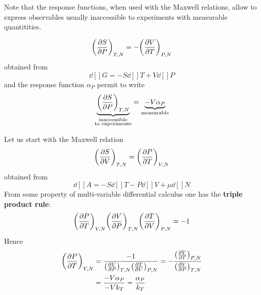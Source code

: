 \documentclass[../main/main.tex]{subfiles}
\begin{document}
Note that the response functions, when used with the Maxwell relations, allow to express observables usually inaccessible to experiments with measurable quantitities.
\begin{example}
  \begin{equation*}
    \qty(\pdv{S}{P} )_{T,N} = - \qty(\pdv{V}{T} )_{P,N}
  \end{equation*}
  obtained from
  \begin{equation*}
\dd[]{G} = - S \dd[]{T} + V \dd[]{P}
  \end{equation*}
and the response function \( \alpha _P \) permit to write
\begin{equation}
  \underbrace{\qty(\pdv{S}{P} )_{T,N}}_{\substack{ \text{inaccessible} \\  \text{to experiments} } }  = \underbrace{- V \alpha _P}_{\text{measurable}}
  \label{eq:}
\end{equation}
\end{example}
\begin{example}
Let us start with the Maxwell relation
\begin{equation*}
  \qty(\pdv{S}{V} )_{T,N} =  \qty(\pdv{P}{T} )_{V,N}
\end{equation*}
obtained from
\begin{equation*}
    \dd[]{A} = - S \dd[]{T} - P \dd[]{V} + \mu \dd[]{N}
\end{equation*}
From some property of multi-variable differential calculus one has the \textbf{triple product rule}:
\begin{equation}
    \qty(\pdv{P}{T} )_{V,N}  \qty(\pdv{V}{P} )_{T,N}   \qty(\pdv{T}{V} )_{P,N} =-1
  \label{eq:}
\end{equation}
Hence
\begin{equation}
\begin{split}
    \qty(\pdv{P}{T} )_{V,N} &= \frac{-1}{ \qty(\pdv{V}{P} )_{T,N}   \qty(\pdv{T}{V} )_{P,N} }  = - \frac{  \qty(\pdv{V}{T} )_{P,N} }{   \qty(\pdv{V}{P} )_{T,N} } \\
    &= \frac{-V \alpha _P}{-V k_T} = \frac{\alpha _P}{k _T}
\end{split}
  \label{eq:}
\end{equation}
\end{example}
\end{document}
